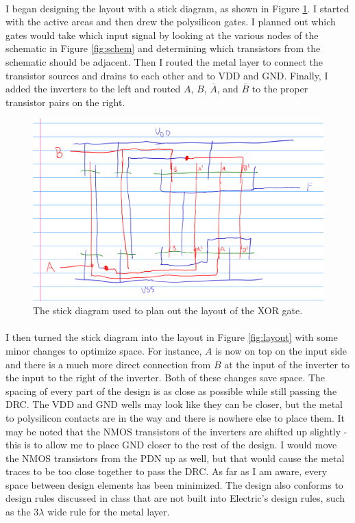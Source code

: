 \documentclass{article}
\begin{document}
  \paragraph{}
  I began designing the layout with a stick diagram, as shown in Figure \ref{fig:stick}. I started with the active areas and then drew the polysilicon gates. I planned out which gates would take which input signal by looking at the various nodes of the schematic in Figure \ref{fig:schem} and determining which transistors from the schematic should be adjacent. Then I routed the metal layer to connect the transistor sources and drains to each other and to VDD and GND. Finally, I added the inverters to the left and routed $A$, $B$, $\overline{A}$, and $\overline{B}$ to the proper transistor pairs on the right.


  \begin{figure}[H]
    \centering
    \includegraphics[width=0.7\linewidth, frame]{screenshots/stick-diagram.png}
    \caption{The stick diagram used to plan out the layout of the XOR gate.}
    \label{fig:stick}
  \end{figure}

  \paragraph{}
  I then turned the stick diagram into the layout in Figure \ref{fig:layout} with some minor changes to optimize space. For instance, $A$ is now on top on the input side and there is a much more direct connection from $B$ at the input of the inverter to the input to the right of the inverter. Both of these changes save space. The spacing of every part of the design is as close as possible while still passing the DRC. The VDD and GND wells may look like they can be closer, but the metal to polysilicon contacts are in the way and there is nowhere else to place them. It may be noted that the NMOS transistors of the inverters are shifted up slightly - this is to allow me to place GND closer to the rest of the design. I would move the NMOS transistors from the PDN up as well, but that would cause the metal traces to be too close together to pass the DRC. As far as I am aware, every space between design elements has been minimized. The design also conforms to design rules discussed in class that are not built into Electric's design rules, such as the 3$\lambda$ wide rule for the metal layer.
\end{document}
